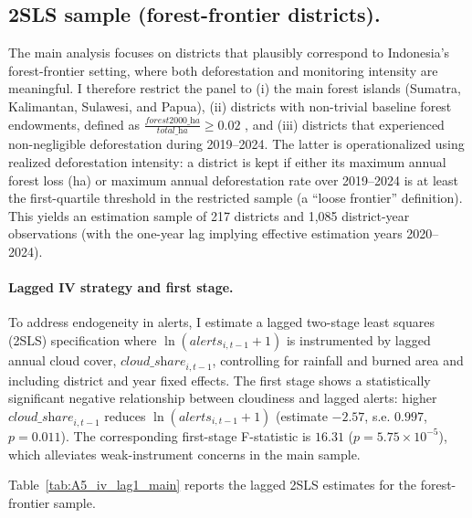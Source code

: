 \documentclass[hidelinks,12pt]{article}
\begin{document}
\subsection{2SLS sample (forest-frontier districts).}
\label{main2sls}
The main analysis focuses on districts that plausibly correspond to Indonesia’s forest-frontier setting, where both deforestation and monitoring intensity are meaningful. I therefore restrict the panel to (i) the main forest islands (Sumatra, Kalimantan, Sulawesi, and Papua), (ii) districts with non-trivial baseline forest endowments, defined as $\frac{\textit{forest2000\_ha}}{\textit{total\_ha}} \ge 0.02$
, and (iii) districts that experienced non-negligible deforestation during 2019–2024. The latter is operationalized using realized deforestation intensity: a district is kept if either its maximum annual forest loss (ha) or maximum annual deforestation rate over 2019–2024 is at least the first-quartile threshold in the restricted sample (a “loose frontier” definition). This yields an estimation sample of 217 districts and 1,085 district-year observations (with the one-year lag implying effective estimation years 2020–2024).

\paragraph{Lagged IV strategy and first stage.}
To address endogeneity in alerts, I estimate a lagged two-stage least squares (2SLS) specification where $\ln(\textit{alerts}_{i,t-1}+1)$ is instrumented by lagged annual cloud cover, $\textit{cloud\_share}_{i,t-1}$, controlling for rainfall and burned area and including district and year fixed effects. The first stage shows a statistically significant negative relationship between cloudiness and lagged alerts: higher $\textit{cloud\_share}_{i,t-1}$ reduces $\ln(\textit{alerts}_{i,t-1}+1)$ (estimate $-2.57$, s.e. $0.997$, $p=0.011$). The corresponding first-stage F-statistic is $16.31$ ($p=5.75\times10^{-5}$), which alleviates weak-instrument concerns in the main sample.

Table~\ref{tab:A5_iv_lag1_main} reports the lagged 2SLS estimates for the forest-frontier sample.\\

\begin{table}[H]
  \caption{2SLS estimates (first and second stages), preferred frontier sample}
  \label{tab:A5_iv_lag1_main}
  \centering
  
\end{table}
\end{document}
